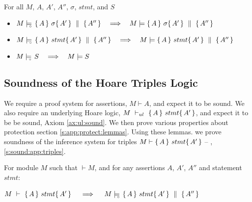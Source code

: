\begin{lemma}
For all $M$, $A$, $A'$, $A''$, $\sigma$, $stmt$, and $S$
\begin{itemize}
\item
 $M \models\!\!\!\!_{_{\circ}}\   \{\, A \, \}\ \sigma \{\, A' \, \} \, \,\parallel\,\, \{\, A'' \, \}    \ \ \ \Longrightarrow \ \ \   M \models  \{\, A \, \}\ \sigma \{\, A' \, \} \, \,\parallel\,\, \{\, A'' \, \} $

\item
 $M \models\!\!\!\!_{_{\circ}}\   \{\, A \, \}\ stmt \{\, A' \, \} \, \,\parallel\,\, \{\, A'' \, \}    \ \ \ \Longrightarrow \ \ \   M \models  \{\, A \, \}\ stmt \{\, A' \, \} \, \,\parallel\,\, \{\, A'' \, \} $
\item 
$\satisfiesD {M} {S}  \ \ \ \Longrightarrow \ \ \ \satisfies {M} {S}$
\end{itemize}
\end{lemma}






\subsection{Soundness of the Hoare Triples Logic}

We require a  proof system for assertions, $M\vdash A$, and expect it to be sound.
We also require
an   underlying Hoare logic, $M\ \vdash_{ul}\   \{\, A \, \}\ stmt \{\, A' \, \}$, and expect it to be be  sound, \cf Axiom \ref{ax:ul:sound}.
\label{sect:prove:triples:sound}
We then prove various properties about protection
\cf section \ref{s:app:protect:lemmas}.
Using these lemmas. we prove soundness of the inference system for triples $M \vdash   \{\, A \, \}\ stmt \{\, A' \, \} $ -- \cf \A, \ref{s:sound:app:triples}.

 

\begin{Theorem}
\label{l:triples:sound}
For module  $M$   such that  $\vdash M$, and for any assertions $A$,  $A'$, $A''$ and statement  $stmt$:
\begin{center}
$M\ \vdash\  \triple A {stmt} {A'}  \ \ \ \  \Longrightarrow  \ \ \ \ \satisfiesD {M} {\quadruple {A} {stmt} {A'} {A''}}$
\end{center}
\end{Theorem}
 

